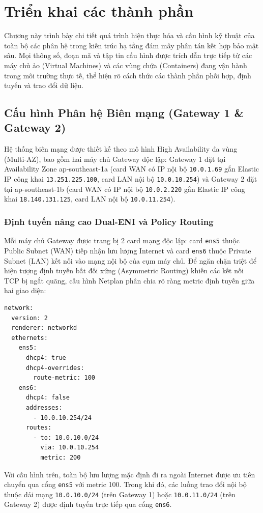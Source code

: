 \chapter{Triển khai các thành phần}
\label{ch:deployment}

Chương này trình bày chi tiết quá trình hiện thực hóa và cấu hình kỹ thuật của toàn bộ các phân hệ trong kiến trúc hạ tầng đám mây phân tán kết hợp bảo mật sâu. Mọi thông số, đoạn mã và tập tin cấu hình được trích dẫn trực tiếp từ các máy chủ ảo (Virtual Machines) và các vùng chứa (Containers) đang vận hành trong môi trường thực tế, thể hiện rõ cách thức các thành phần phối hợp, định tuyến và trao đổi dữ liệu.

\section{Cấu hình Phân hệ Biên mạng (Gateway 1 \& Gateway 2)}

Hệ thống biên mạng được thiết kế theo mô hình High Availability đa vùng (Multi-AZ), bao gồm hai máy chủ Gateway độc lập: Gateway 1 đặt tại Availability Zone ap-southeast-1a (card WAN có IP nội bộ \texttt{10.0.1.69} gắn Elastic IP công khai \texttt{13.251.225.100}, card LAN nội bộ \texttt{10.0.10.254}) và Gateway 2 đặt tại ap-southeast-1b (card WAN có IP nội bộ \texttt{10.0.2.220} gắn Elastic IP công khai \texttt{18.140.131.125}, card LAN nội bộ \texttt{10.0.11.254}).

\subsection{Định tuyến nâng cao Dual-ENI và Policy Routing}
Mỗi máy chủ Gateway được trang bị 2 card mạng độc lập: card \texttt{ens5} thuộc Public Subnet (WAN) tiếp nhận lưu lượng Internet và card \texttt{ens6} thuộc Private Subnet (LAN) kết nối vào mạng nội bộ của cụm máy chủ. Để ngăn chặn triệt để hiện tượng định tuyến bất đối xứng (Asymmetric Routing) khiến các kết nối TCP bị ngắt quãng, cấu hình Netplan phân chia rõ ràng metric định tuyến giữa hai giao diện:

\begin{lstlisting}[language=bash, caption={Cấu hình Policy Routing Dual-ENI (/etc/netplan/60-dual-eni.yaml)}]
network:
  version: 2
  renderer: networkd
  ethernets:
    ens5:
      dhcp4: true
      dhcp4-overrides:
        route-metric: 100
    ens6:
      dhcp4: false
      addresses:
        - 10.0.10.254/24
      routes:
        - to: 10.0.10.0/24
          via: 10.0.10.254
          metric: 200
\end{lstlisting}
Với cấu hình trên, toàn bộ lưu lượng mặc định đi ra ngoài Internet được ưu tiên chuyển qua cổng \texttt{ens5} với metric 100. Trong khi đó, các luồng trao đổi nội bộ thuộc dải mạng \texttt{10.0.10.0/24} (trên Gateway 1) hoặc \texttt{10.0.11.0/24} (trên Gateway 2) được định tuyến trực tiếp qua cổng \texttt{ens6}.

